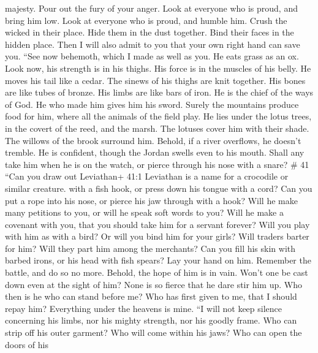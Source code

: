 majesty.  Pour out the fury of your anger. Look at everyone
who is proud, and bring him low.  Look at everyone who is
proud, and humble him. Crush the wicked in their place. 
Hide them in the dust together. Bind their faces in the hidden place.
 Then I will also admit to you that your own right hand can
save you.  ``See now behemoth, which I made as well as you.
He eats grass as an ox.  Look now, his strength is in his
thighs. His force is in the muscles of his belly.  He moves
his tail like a cedar. The sinews of his thighs are knit together.
 His bones are like tubes of bronze. His limbs are like
bars of iron.  He is the chief of the ways of God. He who
made him gives him his sword.  Surely the mountains produce
food for him, where all the animals of the field play.  He
lies under the lotus trees, in the covert of the reed, and the marsh.
 The lotuses cover him with their shade. The willows of the
brook surround him.  Behold, if a river overflows, he
doesn't tremble. He is confident, though the Jordan swells even to his
mouth.  Shall any take him when he is on the watch, or
pierce through his nose with a snare? \# 41  ``Can you draw
out Leviathan+ 41:1 Leviathan is a name for a crocodile or similar
creature. with a fish hook, or press down his tongue with a cord?
 Can you put a rope into his nose, or pierce his jaw through
with a hook?  Will he make many petitions to you, or will he
speak soft words to you?  Will he make a covenant with you,
that you should take him for a servant forever?  Will you
play with him as with a bird? Or will you bind him for your girls?
 Will traders barter for him? Will they part him among the
merchants?  Can you fill his skin with barbed irons, or his
head with fish spears?  Lay your hand on him. Remember the
battle, and do so no more.  Behold, the hope of him is in
vain. Won't one be cast down even at the sight of him? 
None is so fierce that he dare stir him up. Who then is he who can stand
before me?  Who has first given to me, that I should repay
him? Everything under the heavens is mine.  ``I will not
keep silence concerning his limbs, nor his mighty strength, nor his
goodly frame.  Who can strip off his outer garment? Who
will come within his jaws?  Who can open the doors of his
